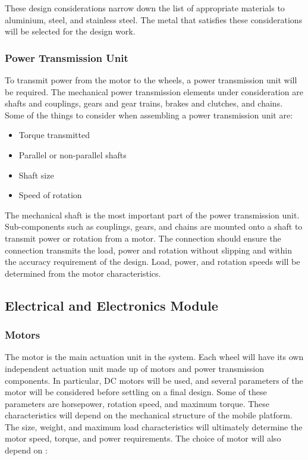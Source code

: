 These design considerations narrow down the list of appropriate materials to aluminium, steel, and stainless steel.
The metal that satisfies these considerations will be selected for the design work.

\subsubsection{Power Transmission Unit}

To transmit power from the motor to the wheels, a power transmission unit will be required.
The mechanical power transmission elements under consideration are shafts and couplings, gears and gear trains, brakes and clutches, and chains.
Some of the things to consider when assembling a power transmission unit are:

\begin{itemize}
    
    \item Torque transmitted
    
    \item Parallel or non-parallel shafts
    
    \item Shaft size
    
    \item Speed of rotation
    
\end{itemize}

The mechanical shaft is the most important part of the power transmission unit.
Sub-components such as couplings, gears, and chains are mounted onto a shaft to transmit power or rotation from a motor.
The connection should ensure the connection transmits the load, power and rotation without slipping and within the accuracy requirement of the design.
Load, power, and rotation speeds will be determined from the motor characteristics.

\subsection{Electrical and Electronics Module}

\subsubsection{Motors}
The motor is the main actuation unit in the system.
Each wheel will have its own independent actuation unit made up of motors and power transmission components.
In particular, \ac{DC} motors will be used, and several parameters of the motor will be considered before settling on a final design.
Some of these parameters are horsepower, rotation speed, and maximum torque.
These characteristics will depend on the mechanical structure of the mobile platform.
The size, weight, and maximum load characteristics will ultimately determine the motor speed, torque, and power requirements. 
The choice of motor will also depend on : 

